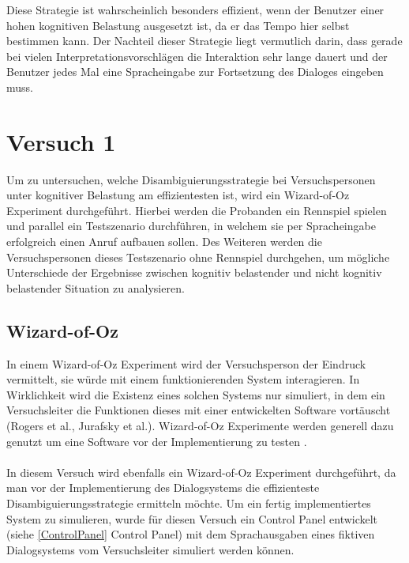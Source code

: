 \documentclass[12pt,a4paper]{scrartcl}
\begin{document}
Diese Strategie ist wahrscheinlich besonders effizient, wenn der Benutzer einer hohen kognitiven Belastung ausgesetzt ist, da er das Tempo hier selbst bestimmen kann. Der Nachteil dieser Strategie liegt vermutlich darin, dass gerade bei vielen Interpretationsvorschlägen die Interaktion sehr lange dauert und der Benutzer jedes Mal eine Spracheingabe zur Fortsetzung des Dialoges eingeben muss. 

\section{Versuch 1}
\label{versuch1}
Um zu untersuchen, welche Disambiguierungsstrategie bei Versuchspersonen unter kognitiver Belastung am effizientesten ist, wird ein Wizard-of-Oz Experiment durchgeführt. Hierbei werden die Probanden ein Rennspiel spielen und parallel ein Testszenario durchführen, in welchem sie per Spracheingabe erfolgreich einen Anruf aufbauen sollen. Des Weiteren werden die Versuchspersonen dieses Testszenario ohne Rennspiel durchgehen, um mögliche Unterschiede der Ergebnisse zwischen kognitiv belastender und nicht kognitiv belastender Situation zu analysieren. 
\subsection{Wizard-of-Oz}
\label{WOZ}
In einem Wizard-of-Oz Experiment wird der Versuchsperson der Eindruck vermittelt, sie würde mit einem funktionierenden System interagieren. In Wirklichkeit wird die Existenz eines solchen Systems nur simuliert, in dem ein Versuchsleiter die Funktionen dieses mit einer entwickelten Software vortäuscht (Rogers et al., Jurafsky et al.). Wizard-of-Oz Experimente werden generell dazu genutzt um eine Software vor der Implementierung zu testen \cite{SaLP}.\\ \\
In diesem Versuch wird ebenfalls ein Wizard-of-Oz Experiment durchgeführt, da man vor der Implementierung des Dialogsystems die effizienteste Disambiguierungsstrategie ermitteln möchte. Um ein fertig implementiertes System zu simulieren, wurde für diesen Versuch ein Control Panel entwickelt (siehe \ref{ControlPanel} Control Panel) mit dem Sprachausgaben eines fiktiven Dialogsystems vom Versuchsleiter simuliert werden können. 
\end{document}
